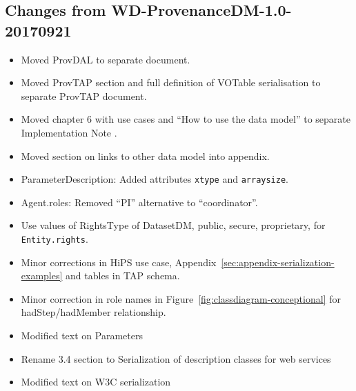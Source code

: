 \documentclass[11pt,a4paper]{ivoa}
\newcommand{\attribute}[1]{\texttt{#1}}
\begin{document}
\begin{appendices}
\subsection{Changes from WD-ProvenanceDM-1.0-20170921}
\begin{itemize}
\item Moved ProvDAL to separate document.
\item Moved ProvTAP section and full definition of VOTable serialisation to separate ProvTAP document.
\item Moved chapter 6 with use cases and ``How to use the data model'' to  separate Implementation Note \citep{std:ProvenanceImplementationNote}.
\item Moved section on links to other data model into appendix.
\item ParameterDescription: Added attributes \attribute{xtype} and \attribute{arraysize}.
\item Agent.roles: Removed ``PI'' alternative to ``coordinator''.
\item Use values of RightsType of DatasetDM, public, secure, proprietary, for \attribute{Entity.rights}.
\item Minor corrections in HiPS use case, Appendix~\ref{sec:appendix-serialization-examples} and tables in TAP schema.
\item Minor correction in role names in Figure~\ref{fig:classdiagram-conceptional} for hadStep/hadMember relationship.
\item Modified text on Parameters
\item Rename 3.4 section to Serialization of description classes for web services
\item Modified text on W3C serialization
\end{itemize}


\end{appendices}
\end{document}
